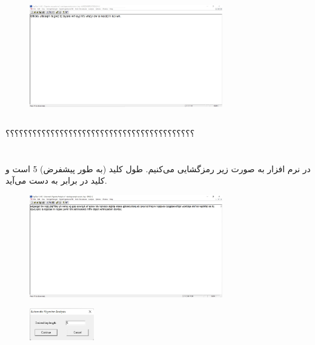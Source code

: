 \documentclass{article}
\begin{document}
\begin{figure}[H]
    \centering
    \includegraphics[width=0.75\textwidth]{figures/3bc.jpg}
    \caption
	{}
    \label{fig:fig1}
\end{figure}

\subsection{}
؟؟؟؟؟؟؟؟؟؟؟؟؟؟؟؟؟؟؟؟؟؟؟؟؟؟؟؟؟؟؟؟؟؟؟؟؟؟؟؟؟؟




\section{}%
در نرم افزار  به صورت زیر رمزگشایی می‌کنیم. طول کلید (به طور پیشفرض) 5 است و کلید در  برابر  به دست می‌آید.
\begin{figure}[H]
    \centering
    \includegraphics[width=0.75\textwidth]{figures/4a.jpg}
    \caption
	{}
    \label{fig:fig1}
\end{figure}

\begin{figure}[H]
    \centering
    \includegraphics[width=0.25\textwidth]{figures/4b.jpg}
    \caption
	{}
    \label{fig:fig1}
\end{figure}
\end{document}
